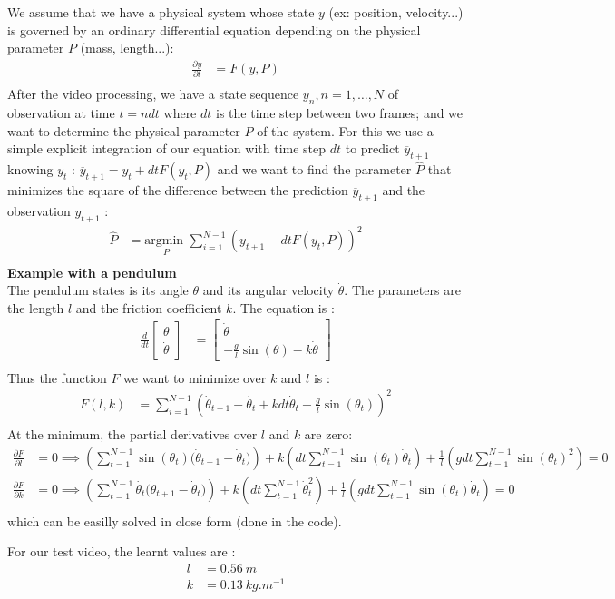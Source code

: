 \documentclass[11pt, oneside]{amsart}
\begin{document}
We assume that we have a physical system whose state $y$ (ex: position, velocity...) is governed by an ordinary differential equation depending on the physical parameter $P$ (mass, length...):
\begin{align*}
  \frac{\partial y}{\partial t} &= F(y, P)\\
\end{align*}
After the video processing, we have a state sequence $y_n, n=1, \ldots, N$ of observation at time $t = n dt$ where $dt$ is the time step between two frames; and we want to determine the physical parameter $P$ of the system.
For this we use a simple explicit integration of our equation with time step $dt$ to predict $\overline{y}_{t+1}$ knowing $y_t$ : $\overline{y}_{t+1} = y_t + dtF(y_t, P)$ and we want to find the parameter $\hat{P}$ that minimizes the square of the difference between the prediction $\overline{y}_{t+1}$ and the observation $y_{t+1}$ :
\begin{align*}
  \hat{P} &= \underset{P}{\text{argmin }} \sum_{i=1}^{N-1}{\left( y_{t+1} - dtF(y_t, P)\right)^2}\\
\end{align*}
\textbf{Example with a pendulum}\\
The pendulum states is its angle $\theta$ and its angular velocity $\dot{\theta}$.
The parameters are the length $l$ and the friction coefficient $k$.
The equation is :
\begin{align*}
  \frac{d}{dt}\left [ \begin{array}{c} \theta \\ \dot{\theta} \end{array} \right ]
    &=
    \left [ \begin{array}{c} \dot{\theta} \\ -\frac{g}{l}\sin(\theta) - k \dot{\theta} \end{array} \right ]
    \\
\end{align*}
Thus the function $F$ we want to minimize over $k$ and $l$ is :
\begin{align*}
  F(l, k) &= \sum_{i=1}^{N-1}{\left( \dot{\theta}_{t+1} - \dot{\theta_t} + kdt\dot{\theta}_t + \frac{g}{l}\sin(\theta_t) \right)^2}\\
\end{align*}
At the minimum, the partial derivatives over $l$ and $k$ are zero:
\begin{align*}
  \frac{\partial F}{\partial l} &= 0 \implies
    \left( \sum_{t=1}^{N-1}{\sin(\theta_t)(\dot{\theta}_{t+1} - \dot{\theta}_{t}}) \right) +
    k \left( dt \sum_{t=1}^{N-1}{\sin(\theta_t)\dot{\theta}_{t}} \right) +
    \frac{1}{l} \left( gdt \sum_{t=1}^{N-1}{\sin(\theta_t)^2} \right) = 0\\
  \frac{\partial F}{\partial k} &= 0 \implies
    \left( \sum_{t=1}^{N-1}{\dot{\theta_t}(\dot{\theta}_{t+1} - \dot{\theta}_{t}}) \right) +
    k \left( dt \sum_{t=1}^{N-1}{\dot{\theta}_{t}^2} \right) +
    \frac{1}{l} \left( gdt \sum_{t=1}^{N-1}{\sin(\theta_t) \dot{\theta}_t} \right) = 0\\
\end{align*}
which can be easilly solved in close form (done in the code).

For our test video, the learnt values are :
\begin{align*}
  l &= 0.56 \ m\\
  k &= 0.13 \ kg.m^{-1}
\end{align*}
\end{document}
